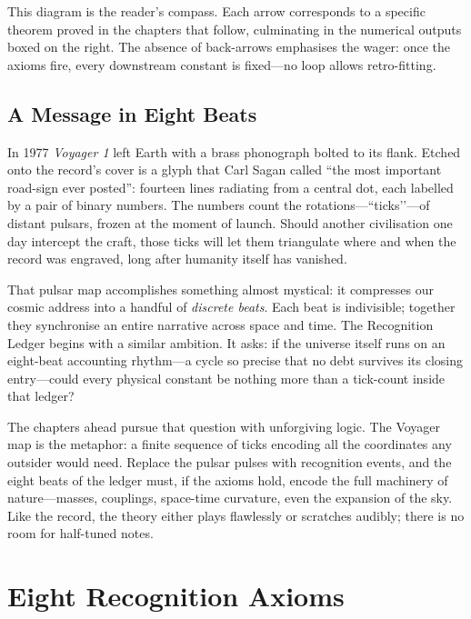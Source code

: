 \documentclass[11pt]{article}
\begin{document}
\noindent
This diagram is the reader's compass. Each arrow corresponds to a specific theorem proved in the chapters that follow, culminating in the numerical outputs boxed on the right. The absence of back-arrows emphasises the wager: once the axioms fire, every downstream constant is fixed—no loop allows retro-fitting.

\subsection{A Message in Eight Beats}
\label{subsec:voyager-eight-beats}

In 1977 \emph{Voyager 1} left Earth with a brass phonograph bolted to its flank.  Etched onto the record’s cover is a glyph that Carl Sagan called “the most important road-sign ever posted”: fourteen lines radiating from a central dot, each labelled by a pair of binary numbers.  The numbers count the rotations—``ticks’’—of distant pulsars, frozen at the moment of launch.  Should another civilisation one day intercept the craft, those ticks will let them triangulate where and when the record was engraved, long after humanity itself has vanished.

That pulsar map accomplishes something almost mystical: it compresses our cosmic address into a handful of \emph{discrete beats}.  Each beat is indivisible; together they synchronise an entire narrative across space and time.  The Recognition Ledger begins with a similar ambition.  It asks: if the universe itself runs on an eight-beat accounting rhythm—a cycle so precise that no debt survives its closing entry—could every physical constant be nothing more than a tick-count inside that ledger?  

The chapters ahead pursue that question with unforgiving logic.  The Voyager map is the metaphor: a finite sequence of ticks encoding all the coordinates any outsider would need.  Replace the pulsar pulses with recognition events, and the eight beats of the ledger must, if the axioms hold, encode the full machinery of nature—masses, couplings, space-time curvature, even the expansion of the sky.  Like the record, the theory either plays flawlessly or scratches audibly; there is no room for half-tuned notes.

\section{Eight Recognition Axioms}
\label{sec:axioms}
\end{document}
